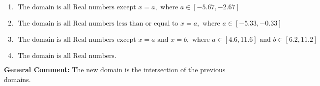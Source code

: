 \documentclass{extbook}[14pt]
\begin{document}
\begin{enumerate}
{\begin{enumerate}[label=\Alph*.]
\item \( \text{ The domain is all Real numbers except } x = a, \text{ where } a \in [-5.67, -2.67] \)


\item \( \text{ The domain is all Real numbers less than or equal to } x = a, \text{ where } a \in [-5.33, -0.33] \)


\item \( \text{ The domain is all Real numbers except } x = a \text{ and } x = b, \text{ where } a \in [4.6, 11.6] \text{ and } b \in [6.2, 11.2] \)


\item \( \text{ The domain is all Real numbers. } \)


\end{enumerate}

\textbf{General Comment:} The new domain is the intersection of the previous domains.
}
\end{enumerate}
\end{document}
